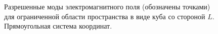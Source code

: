 \begin{figure}
\centering

\caption{Разрешенные моды электромагнитного поля (обозначены точками) для ограниченной
  области пространства в виде куба со стороной $L$. Прямоугольная
  система координат.}
\label{figCh1_pic3}
\end{figure}
